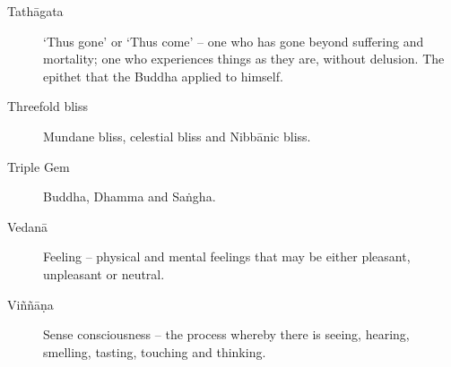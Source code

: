 \begin{description}
\item[Tathāgata] ‘Thus gone’ or ‘Thus come’ – one who has gone beyond
  suffering and mortality; one who experiences things as they are,
  without delusion. The epithet that the Buddha applied to himself.

\item[Threefold bliss] Mundane bliss, celestial bliss and Nibbānic
  bliss.

\item[Triple Gem] Buddha, Dhamma and Saṅgha.

\item[Vedanā] Feeling – physical and mental feelings that may be either
  pleasant, unpleasant or neutral.

\item[Viññāṇa] Sense consciousness – the process whereby there is
  seeing, hearing, smelling, tasting, touching and thinking.

\end{description}

